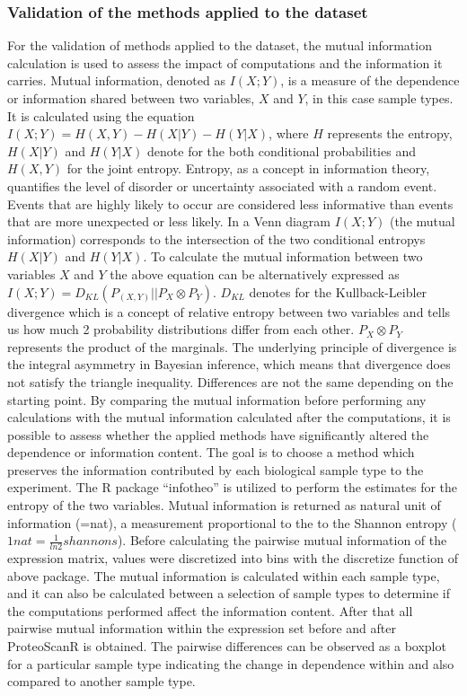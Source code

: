 \documentclass[
  11pt,
]{article}
\begin{document}
\hypertarget{validation-of-the-methods-applied-to-the-dataset}{%
\subsubsection{Validation of the methods applied to the
dataset}\label{validation-of-the-methods-applied-to-the-dataset}}

For the validation of methods applied to the dataset, the mutual
information calculation is used to assess the impact of computations and
the information it carries. Mutual information, denoted as \(I(X;Y)\),
is a measure of the dependence or information shared between two
variables, \(X\) and \(Y\), in this case sample types. It is calculated
using the equation \(I(X;Y) = H(X,Y) - H(X|Y) - H(Y|X)\), where \(H\)
represents the entropy, \(H(X|Y)\) and \(H(Y|X)\) denote for the both
conditional probabilities and \(H(X,Y)\) for the joint entropy. Entropy,
as a concept in information theory, quantifies the level of disorder or
uncertainty associated with a random event. Events that are highly
likely to occur are considered less informative than events that are
more unexpected or less likely. In a Venn diagram \(I(X;Y)\) (the mutual
information) corresponds to the intersection of the two conditional
entropys \(H(X|Y)\) and \(H(Y|X)\). To calculate the mutual information
between two variables \(X\) and \(Y\) the above equation can be
alternatively expressed as
\(I(X;Y) = D_{KL} (P_{(X,Y)} || P_{X} \otimes P_{Y})\). \(D_{KL}\)
denotes for the Kullback-Leibler \citep{Kullback1951} divergence which
is a concept of relative entropy between two variables and tells us how
much 2 probability distributions differ from each other.
\(P_{X} \otimes P_{Y}\) represents the product of the marginals. The
underlying principle of divergence is the integral asymmetry in Bayesian
inference, which means that divergence does not satisfy the triangle
inequality. Differences are not the same depending on the starting
point. By comparing the mutual information before performing any
calculations with the mutual information calculated after the
computations, it is possible to assess whether the applied methods have
significantly altered the dependence or information content. The goal is
to choose a method which preserves the information contributed by each
biological sample type to the experiment. The R package ``infotheo'' is
utilized to perform the estimates for the entropy of the two variables.
Mutual information is returned as natural unit of information (=nat), a
measurement proportional to the to the Shannon entropy
(\(1nat = \frac{1}{ln2} shannons\)). Before calculating the pairwise
mutual information of the expression matrix, values were discretized
into bins with the discretize function of above package. The mutual
information is calculated within each sample type, and it can also be
calculated between a selection of sample types to determine if the
computations performed affect the information content. After that all
pairwise mutual information within the expression set before and after
ProteoScanR is obtained. The pairwise differences can be observed as a
boxplot for a particular sample type indicating the change in dependence
within and also compared to another sample type.
\end{document}
